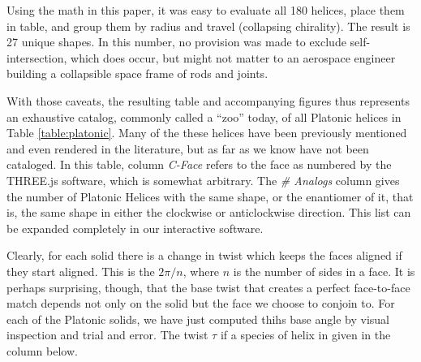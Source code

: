 \documentclass[11pt]{article}
\begin{document}
{Using the math in this paper, it was easy to evaluate all 180 helices,
place them in table, and group them
by radius and travel (collapsing chirality).
The result is 27 unique shapes. In this number, no provision was made to exclude
self-intersection,
which does occur, but might not matter to
an aerospace engineer building a collapsible space frame of rods and joints.


With those caveats, the resulting table and accompanying figures thus represents an exhaustive catalog,
commonly called a ``zoo'' today, of all Platonic
helices in Table \ref{table:platonic}.
Many of the these helices have been previously mentioned and even rendered in the literature,
but as far as we know have not been cataloged. In this table, column {\em C-Face} refers to the
face as numbered by the THREE.js software\cite{dirksen2013learning}, which is somewhat arbitrary. The {\em \# Analogs}
column gives the number of Platonic Helices with the same shape, or the enantiomer of it, that is, the same
shape in either the clockwise or anticlockwise direction. This list can be expanded completely in our interactive software.

Clearly, for each solid there is a change in twist which keeps the faces aligned if they start aligned. This is the $2\pi/n$,
where $n$ is the number of sides in a face. It is perhaps surprising, though, that the base twist that creates
a perfect face-to-face match depends not only on the solid but the face we choose to conjoin to. For each of the Platonic
solids, we have just computed thihs base angle by visual inspection and trial and error. The twist $\tau$ if a species
of helix in given in the column below.

}
\end{document}
